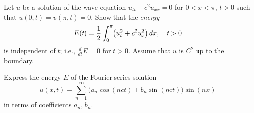 \begin{problem}
  \begin{alphlist}
  \item Let \(u\) be a solution of the wave equation \(u_{tt}-c^2u_{xx}=0\)
    for \(0<x<\pi\), \(t>0\) such that \(u(0,t)=u(\pi,t)=0\). Show that the
    \emph{energy}
    \[
      E(t)=\frac{1}{2}\int_0^\pi \bigl(u_t^2+c^2u_x^2 \bigr)\mathop{}\!d x,\quad t>0
    \]
    is independent of \(t\); i.e., \(\frac{d}{dt}E=0\) for \(t>0\). Assume that
    \(u\) is \(C^2\) up to the boundary.
  \item Express the energy \(E\) of the Fourier series solution
    \[
      u(x,t)=\sum_{n=1}^\infty
      \bigl(a_n\cos(nct)+b_n\sin(nct)\bigr)\sin(nx)
    \]
    in terms of coefficients \(a_n\), \(b_n\).
  \end{alphlist}
\end{problem}
